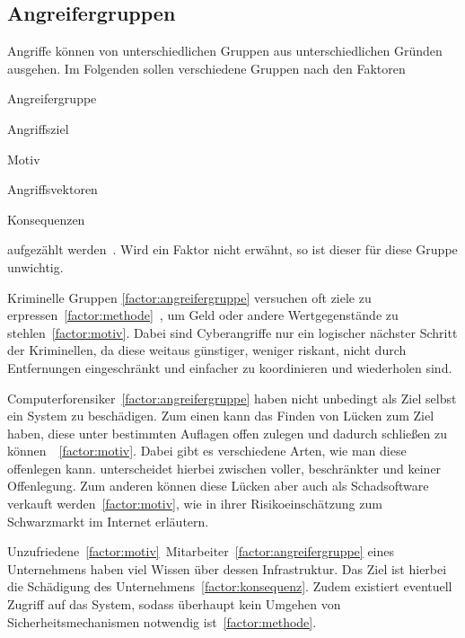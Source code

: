 \documentclass[final,bibliography=totocnumbered]{include/sikseminar}
\begin{document}


    \subsection{Angreifergruppen}
    \label{subsec:angreifergruppen}

    Angriffe können von unterschiedlichen Gruppen aus unterschiedlichen Gründen ausgehen.
    Im Folgenden sollen verschiedene Gruppen nach den Faktoren
    \begin{enumerate*}[label=(\alph*),before=\unskip{: }, itemjoin={{; }}, itemjoin*={{, und }}]
        \item Angreifergruppe\label{factor:angreifergruppe}
        \item Angriffsziel\label{factor:target}
        \item Motiv\label{factor:motiv}
        \item Angriffsvektoren\label{factor:methode}
        \item Konsequenzen\label{factor:konsequenz}
    \end{enumerate*} aufgezählt werden~\cite{HLL+17}.
    Wird ein Faktor nicht erwähnt, so ist dieser für diese Gruppe unwichtig.

    Kriminelle Gruppen \ref{factor:angreifergruppe} versuchen oft ziele zu erpressen~\ref{factor:methode}~\cite{WYX+10}, um Geld oder andere Wertgegenstände zu stehlen~\ref{factor:motiv}.
    Dabei sind Cyberangriffe nur ein logischer nächster Schritt der Kriminellen, da diese weitaus günstiger, weniger riskant, nicht durch Entfernungen eingeschränkt und einfacher zu koordinieren und wiederholen sind. \cite{CAS+09}

    Computerforensiker~\ref{factor:angreifergruppe} haben nicht unbedingt als Ziel selbst ein System zu beschädigen.
    Zum einen kann das Finden von Lücken zum Ziel haben, diese unter bestimmten Auflagen offen zulegen und dadurch schließen zu können~\cite{Hahn2012}~\ref{factor:motiv}.
    Dabei gibt es verschiedene Arten, wie man diese offenlegen kann. \citeauthor{Hahn2012} unterscheidet hierbei zwischen voller, beschränkter und keiner Offenlegung.
    Zum anderen können diese Lücken aber auch als Schadsoftware verkauft werden~\ref{factor:motiv}, wie \citeauthor{Allodi2013} in ihrer Risikoeinschätzung zum Schwarzmarkt im Internet \cite{Allodi2013} erläutern.

    Unzufriedene~\ref{factor:motiv}~Mitarbeiter~\ref{factor:angreifergruppe} eines Unternehmens haben viel Wissen über dessen Infrastruktur.
    Das Ziel ist hierbei die Schädigung des Unternehmens~\ref{factor:konsequenz}.
    Zudem existiert eventuell Zugriff auf das System, sodass überhaupt kein Umgehen von Sicherheitsmechanismen notwendig ist~\ref{factor:methode}.~\cite{CAS+09,WYX+10}
\end{document}
